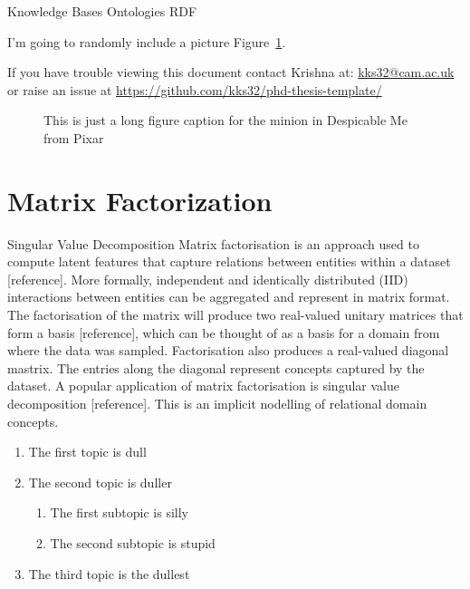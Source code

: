 Knowledge Bases \newline
Ontologies \newline
RDF \newline

I'm going to randomly include a picture Figure~\ref{fig:minion}.


If you have trouble viewing this document contact Krishna at: \href{mailto:kks32@cam.ac.uk}{kks32@cam.ac.uk} or raise an issue at \url{https://github.com/kks32/phd-thesis-template/}


\begin{figure}[htbp!] 
\centering    
\caption[Minion]{This is just a long figure caption for the minion in Despicable Me from Pixar}
\label{fig:minion}
\end{figure}


\section[Short title]{Matrix Factorization}
Singular Value Decomposition
Matrix factorisation is an approach used to compute latent features that capture relations between entities within a dataset [reference]. More formally, independent and identically distributed (IID) interactions between entities can be aggregated and represent in matrix format. The factorisation of the matrix will produce two real-valued unitary matrices that form a basis [reference], which can be thought of as a basis for a domain from where the data was sampled. Factorisation also produces a real-valued diagonal mastrix. The entries along the diagonal represent concepts captured by the dataset. A popular application of matrix factorisation is singular value decomposition [reference]. This is an implicit nodelling of relational domain concepts. \newline

\begin{enumerate}
\item The first topic is dull
\item The second topic is duller
\begin{enumerate}
\item The first subtopic is silly
\item The second subtopic is stupid
\end{enumerate}
\item The third topic is the dullest
\end{enumerate}


